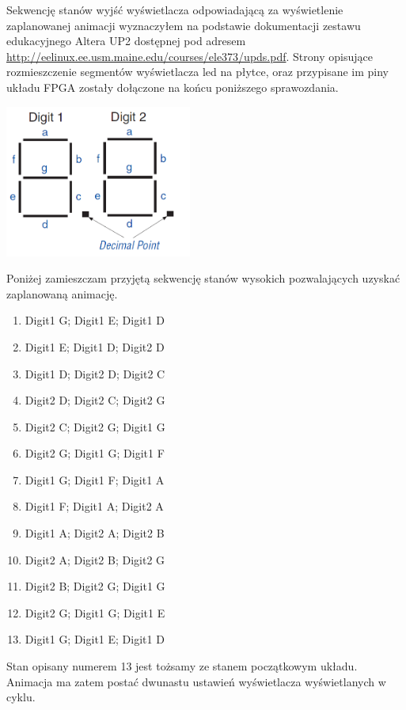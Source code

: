 \documentclass{article}
\begin{document}
        Sekwencję stanów wyjść wyświetlacza odpowiadającą za wyświetlenie zaplanowanej animacji wyznaczyłem na podstawie dokumentacji zestawu edukacyjnego Altera UP2 dostępnej pod adresem \url{http://eelinux.ee.usm.maine.edu/courses/ele373/upds.pdf}. Strony opisujące rozmieszczenie segmentów wyświetlacza led na płytce, oraz przypisane im piny układu FPGA zostały dołączone na końcu poniższego sprawozdania.
        \begin{center}
            \includegraphics[height=5cm]{reports/img/7seg.png}\\
        \end{center}
        Poniżej zamieszczam przyjętą sekwencję stanów wysokich pozwalających uzyskać zaplanowaną animację.
        \begin{enumerate}
            \item Digit1 G; Digit1 E; Digit1 D
            \item Digit1 E; Digit1 D; Digit2 D
            \item Digit1 D; Digit2 D; Digit2 C
            \item Digit2 D; Digit2 C; Digit2 G
            \item Digit2 C; Digit2 G; Digit1 G
            \item Digit2 G; Digit1 G; Digit1 F
            \item Digit1 G; Digit1 F; Digit1 A
            \item Digit1 F; Digit1 A; Digit2 A
            \item Digit1 A; Digit2 A; Digit2 B
            \item Digit2 A; Digit2 B; Digit2 G
            \item Digit2 B; Digit2 G; Digit1 G
            \item Digit2 G; Digit1 G; Digit1 E
            \item Digit1 G; Digit1 E; Digit1 D
        \end{enumerate}
        Stan opisany numerem 13 jest tożsamy ze stanem początkowym układu. Animacja ma zatem postać dwunastu ustawień wyświetlacza wyświetlanych w cyklu. 
    
\end{document}
